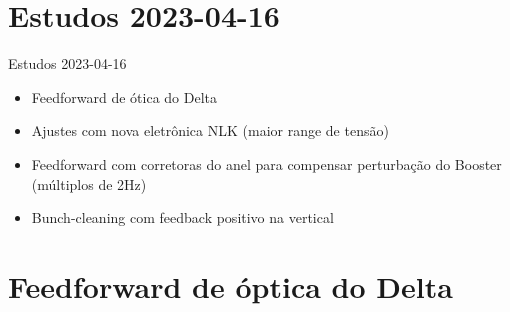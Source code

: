\documentclass[1610]{beamer}					  %
\begin{document}
\section{Estudos 2023-04-16}

\begin{frame}{Estudos 2023-04-16}
    \begin{itemize}
        \item Feedforward de ótica do Delta
        \item Ajustes com nova eletrônica NLK (maior range de tensão)
        \item Feedforward com corretoras do anel para compensar perturbação do Booster (múltiplos de 2Hz)
        \item Bunch-cleaning com feedback positivo na vertical
    \end{itemize}
\end{frame}


\section{Feedforward de óptica do Delta}
\end{document}
